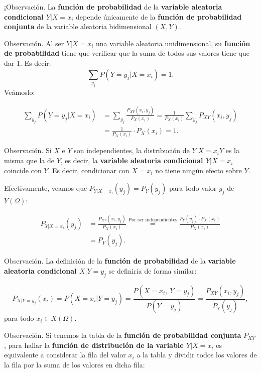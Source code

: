 \documentclass[
  letterpaper,
  DIV=11,
  numbers=noendperiod]{scrreprt}
\begin{document}
¡Observación. La \textbf{función de probabilidad} de la \textbf{variable
aleatoria condicional \(Y|X=x_i\)} depende únicamente de la
\textbf{función de probabilidad conjunta} de la variable aleatoria
bidimensional \((X,Y)\).

Observación. Al ser \(Y|X=x_i\) una variable aleatoria unidimensional,
su \textbf{función de probabilidad} tiene que verificar que la suma de
todos sus valores tiene que dar 1. Es decir: \[
\sum_{y_j} P(Y=y_j|X=x_i)=1.
\] Veámoslo:

\[
\begin{array}{rl}
\sum_{y_j} P(Y=y_j|X=x_i) &=\displaystyle \sum_{y_j} \frac{P_{XY}(x_i,y_j)}{P_X(x_i)}=\frac{1}{P_X(x_i)}\sum_{y_j} P_{XY}(x_i,y_j) \\ 
&=\frac{1}{P_X(x_i)}\cdot P_X(x_i)=1.
\end{array}
\]

Observación. Si \(X\) e \(Y\) son independientes, la distribución de
\(Y|X=x_iY\) es la misma que la de \(Y\), es decir, la \textbf{variable
aleatoria condicional \(Y|X=x_i\)} coincide con \(Y\). Es decir,
condicionar con \(X=x_i\) no tiene ningún efecto sobre \(Y\).

Efectivamente, veamos que \(P_{Y|X=x_i}(y_j)=P_Y(y_j)\) para todo valor
\(y_j\) de \(Y(\Omega)\):

\[
\begin{array}{rl}
P_{Y|X=x_i}(y_j) &=\frac{P_{XY}(x_i,y_j)}{P_X(x_i)} \stackrel{\mbox{Por ser independientes}}{=}\frac{P_Y(y_j)\cdot P_X(x_i)}{P_X(x_i)}\\
& =P_Y(y_j).
\end{array}
\]

Observación. La definición de la \textbf{función de probabilidad} de la
\textbf{variable aleatoria condicional \(X|Y=y_j\)} se definiría de
forma similar:

\[
P_{X|Y=y_j}(x_i)=P(X=x_i|Y=y_j)=\frac{P(X=x_i,\ Y=y_j)}{P(Y=y_j)}=\frac{P_{XY}(x_i,y_j)}{P_Y(y_j)}, 
\] para todo \(x_i\in X(\Omega)\).

Observación. Si tenemos la tabla de la \textbf{función de probabilidad
conjunta} \(P_{XY}\), para hallar la \textbf{función de distribución de
la variable \(Y|X=x_i\)} es equivalente a considerar la fila del valor
\(x_i\) a la tabla y dividir todos los valores de la fila por la suma de
los valores en dicha fila:
\end{document}
